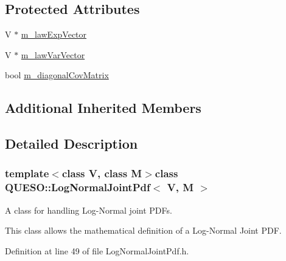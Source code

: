 \subsection*{Protected Attributes}
\begin{DoxyCompactItemize}
\item 
V $\ast$ \hyperlink{class_q_u_e_s_o_1_1_log_normal_joint_pdf_a1373e1737c3198b852fab05c77abea35}{m\-\_\-law\-Exp\-Vector}
\item 
V $\ast$ \hyperlink{class_q_u_e_s_o_1_1_log_normal_joint_pdf_abb84bcddf99dc15b4432baac0fc29122}{m\-\_\-law\-Var\-Vector}
\item 
bool \hyperlink{class_q_u_e_s_o_1_1_log_normal_joint_pdf_a8c85380b9a7c7ab746b2c8cc9c9cf5ee}{m\-\_\-diagonal\-Cov\-Matrix}
\end{DoxyCompactItemize}
\subsection*{Additional Inherited Members}


\subsection{Detailed Description}
\subsubsection*{template$<$class V, class M$>$class Q\-U\-E\-S\-O\-::\-Log\-Normal\-Joint\-Pdf$<$ V, M $>$}

A class for handling Log-\/\-Normal joint P\-D\-Fs. 

This class allows the mathematical definition of a Log-\/\-Normal Joint P\-D\-F. 

Definition at line 49 of file Log\-Normal\-Joint\-Pdf.\-h.



